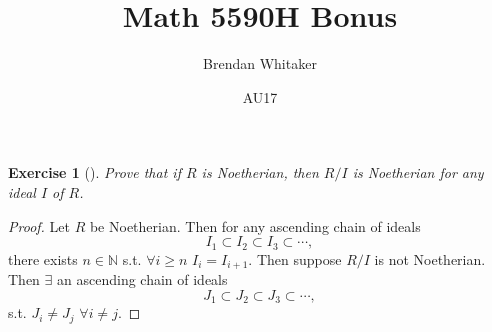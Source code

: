 \documentclass[10pt,oneside,reqno]{amsart}
\theoremstyle{plain}
\newtheorem*{e}{Exercise}
\theoremstyle{definition}
\begin{document}
\title{Math 5590H Bonus}

\date{AU17}

\author[Brendan Whitaker]{Brendan Whitaker}

\maketitle

\begin{e}[]
Prove that if $R$ is Noetherian, then $R/I$ is Noetherian for any ideal $I$ of $R$. 
\end{e}

\begin{proof}
Let $R$ be Noetherian. Then for any ascending chain of ideals 
\[I_1 \subset I_2 \subset I_3 \subset \cdots,\]
there exists $n \in \mathbb{N}$ s.t. $\forall i \geq n$ $I_i = I_{i + 1}$. Then suppose $R/I$ is not Noetherian. Then $\exists$ an ascending chain of ideals 
\[J_1 \subset J_2 \subset J_3 \subset \cdots, \]
s.t. $J_i \neq J_j$ $\forall i \neq j$. 
\end{proof}
\end{document}
